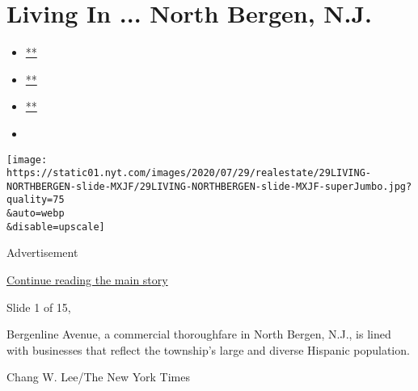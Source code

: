 \hypertarget{living-in--north-bergen-nj}{%
\section{Living In ... North Bergen,
N.J.}\label{living-in--north-bergen-nj}}

\begin{itemize}
\item
  \href{https://www.facebook.com/sharer.php?app_id=9869919170\&u=https\%3A\%2F\%2Fwww.nytimes.com\%2Fslideshow\%2F2020\%2F07\%2F29\%2Frealestate\%2Fliving-in-north-bergen-nj.html\%3Fsmid\%3Dfb-share\&name=Living\%20In\%20...\%20North\%20Bergen\%2C\%20N.J.\&redirect_uri=https\%3A\%2F\%2Fwww.facebook.com\%2F}{**}
\item
  \href{https://twitter.com/intent/tweet?url=https\%3A\%2F\%2Fwww.nytimes.com\%2Fslideshow\%2F2020\%2F07\%2F29\%2Frealestate\%2Fliving-in-north-bergen-nj.html\%3Fsmid\%3Dtw-share\&text=Living\%20In\%20...\%20North\%20Bergen\%2C\%20N.J.}{**}
\item
  \href{mailto:?subject=NYTimes.com\%3A\%20Living\%20In\%20...\%20North\%20Bergen\%2C\%20N.J.\&body=From\%20The\%20New\%20York\%20Times\%3A\%0A\%0ALiving\%20In\%20...\%20North\%20Bergen\%2C\%20N.J.\%0A\%0ASupporters\%20praise\%20the\%20community\%E2\%80\%99s\%20young\%2C\%20culturally\%20diverse\%20population\%20and\%20its\%20(relatively)\%20affordable\%20housing.\%20And\%20then\%20there\%20are\%20the\%20views.\%0A\%0Ahttps\%3A\%2F\%2Fwww.nytimes.com\%2Fslideshow\%2F2020\%2F07\%2F29\%2Frealestate\%2Fliving-in-north-bergen-nj.html\%3Fsmid\%3Dem-share}{**}
\item
\end{itemize}

\texttt{[image: https://static01.nyt.com/images/2020/07/29/realestate/29LIVING-NORTHBERGEN-slide-MXJF/29LIVING-NORTHBERGEN-slide-MXJF-superJumbo.jpg?quality=75\\\&auto=webp\\\&disable=upscale]}

Advertisement

\protect\hyperlink{after-right-0}{Continue reading the main story}

Slide 1 of 15,

Bergenline Avenue, a commercial thoroughfare in North Bergen, N.J., is
lined with businesses that reflect the township's large and diverse
Hispanic population.

Chang W. Lee/The New York Times

